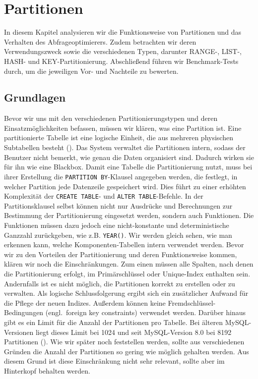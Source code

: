 
\chapter{Partitionen}\label{ch:partitions}

In diesem Kapitel analysieren wir die Funktionsweise von Partitionen und das Verhalten des Abfrageoptimierers.
Zudem betrachten wir deren Verwendungszweck sowie die verschiedenen Typen, darunter RANGE-, LIST-, HASH- und KEY-Partitionierung\@.
Abschließend führen wir Benchmark-Tests durch, um die jeweiligen Vor- und Nachteile zu bewerten.

\section{Grundlagen}\label{sec:partition-grundlagen}

Bevor wir uns mit den verschiedenen Partitionierungstypen und deren Einsatzmöglichkeiten befassen, müssen wir klären, was eine Partition ist.
Eine partitionierte Tabelle ist eine logische Einheit, die aus mehreren physischen Subtabellen besteht (\cite[pp. 265--273]{schwartz2012high}).
Das System verwaltet die Partitionen intern, sodass der Benutzer nicht bemerkt, wie genau die Daten organisiert sind.
Dadurch wirken sie für ihn wie eine Blackbox.
Damit eine Tabelle die Partitionierung nutzt, muss bei ihrer Erstellung die \texttt{PARTITION BY}-Klausel angegeben werden, die festlegt, in welcher Partition jede Datenzeile gespeichert wird.
Dies führt zu einer erhöhten Komplexität der \texttt{CREATE TABLE}- und \texttt{ALTER TABLE}-Befehle.
In der Partitionsklausel selbst können nicht nur Ausdrücke und Berechnungen zur Bestimmung der Partitionierung eingesetzt werden, sondern auch Funktionen.
Die Funktionen müssen dazu jedoch eine nicht-konstante und deterministische Ganzzahl zurückgeben, wie z.B. \texttt{YEAR()}.
Wir werden gleich sehen, wie man erkennen kann, welche Komponenten-Tabellen intern verwendet werden.
Bevor wir zu den Vorteilen der Partitionierung und deren Funktionsweise kommen, klären wir noch die Einschränkungen.
Zum einen müssen alle Spalten, nach denen die Partitionierung erfolgt, im Primärschlüssel oder Unique-Index enthalten sein.
Andernfalls ist es nicht möglich, die Partitionen korrekt zu erstellen oder zu verwalten.
Als logische Schlussfolgerung ergibt sich ein zusätzlicher Aufwand für die Pflege der neuen Indizes.
Außerdem können keine Fremdschlüssel-Bedingungen (engl.\ foreign key constraints) verwendet werden.
Darüber hinaus gibt es ein Limit für die Anzahl der Partitionen pro Tabelle.
Bei älteren MySQL-Versionen liegt dieses Limit bei 1024 und seit MySQL-Version 8.0 bei 8192 Partitionen (\cite{mysql_nof_partitions}).
Wie wir später noch feststellen werden, sollte aus verschiedenen Gründen die Anzahl der Partitionen so gering wie möglich gehalten werden.
Aus diesem Grund ist diese Einschränkung nicht sehr relevant, sollte aber im Hinterkopf behalten werden.

